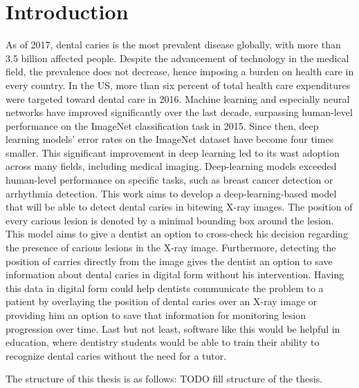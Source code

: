 \chapter{Introduction}

As of 2017, dental caries is the most prevalent disease globally,\cite{Kassebaum2015}\cite{James2018} with more than 3.5 billion affected people.  Despite the advancement of technology in the medical field, the prevalence does not decrease, hence imposing a burden on health care in every country. In the US, more than six percent of total health care expenditures were targeted toward dental care in 2016\cite{Hung2020}.
\newline
Machine learning and especially neural networks have improved significantly over the last decade, surpassing human-level performance on the ImageNet classification task in 2015\cite{He2015ICCV}. Since then, deep learning models' error rates on the ImageNet dataset have become four times smaller\cite{paperwithcode}. This significant improvement in deep learning led to its wast adoption across many fields, including medical imaging. Deep-learning models exceeded human-level performance on specific tasks, such as breast cancer detection\cite{RodriguezRuiz2019} or arrhythmia detection\cite{Hannun2019}.
\newline
This work aims to develop a deep-learning-based model that will be able to detect dental caries in bitewing X-ray images. The position of every carious lesion is denoted by a minimal bounding box around the lesion. This model aims to give a dentist an option to cross-check his decision regarding the presence of carious lesions in the X-ray image. Furthermore, detecting the position of carries directly from the image gives the dentist an option to save information about dental caries in digital form without his intervention. Having this data in digital form could help dentists communicate the problem to a patient by overlaying the position of dental caries over an X-ray image or providing him an option to save that information for monitoring lesion progression over time. Last but not least, software like this would be helpful in education, where dentistry students would be able to train their ability to recognize dental caries without the need for a tutor.


The structure of this thesis is as follows: TODO fill structure of the thesis.

